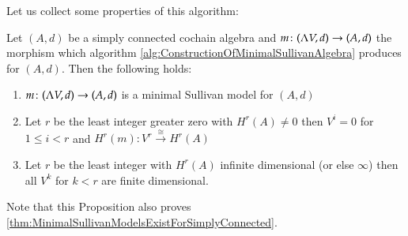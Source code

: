Let us collect some properties of this algorithm:
\begin{Proposition}
\label{prop:PropertiesOfAlgorithm}
 Let $(A,d)$ be a simply connected cochain algebra and $m \colon (\Lambda V,d) \to (A,d)$ the morphism which
 algorithm \ref{alg:ConstructionOfMinimalSullivanAlgebra} produces for $(A,d)$. Then the following  holds:
 \begin{enumerate}
  \item $m \colon (\Lambda V,d) \to (A,d)$ is a minimal Sullivan model for $(A,d)$
  \item Let $r$ be the least integer greater zero with $H^r(A) \neq 0$ then $V^i = 0$ for $1 \leq i < r$ and
    $H^r(m) \colon V^r \overset{\cong}{\to} H^r(A)$
  \item Let $r$ be the least integer with $H^r(A)$ infinite dimensional (or else $\infty$) then
    all $V^k$ for $k < r$ are finite dimensional.
 \end{enumerate}

\end{Proposition}
Note that this Proposition also proves \ref{thm:MinimalSullivanModelsExistForSimplyConnected}.
